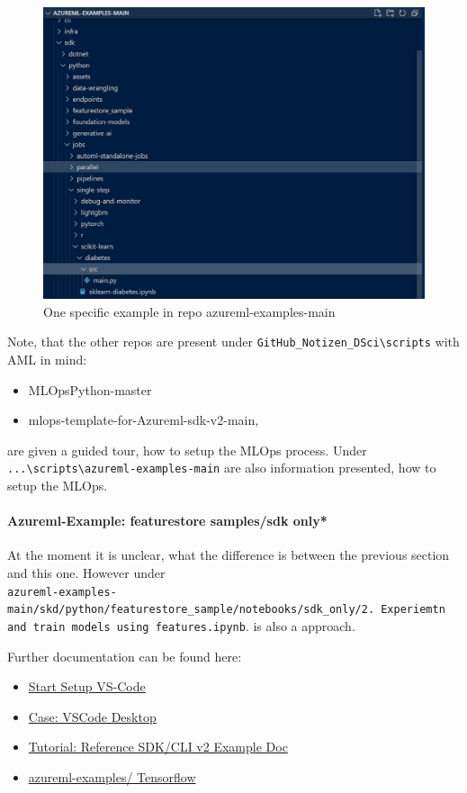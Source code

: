 \begin{figure}[H]
	\centering
	\includegraphics[scale = 0.4]{attachment/chapter_AML/Scc028}
	\caption{One specific example in repo azureml-examples-main}
\end{figure}
Note, that the other repos are present under \verb+GitHub_Notizen_DSci\scripts+ with \gls{AML} in mind:
\begin{itemize}
	\item MLOpsPython-master
	\item mlops-template-for-Azureml-sdk-v2-main,
\end{itemize}
are given a guided tour, how to setup the \gls{MLOps} process. Under \verb+...\scripts\azureml-examples-main+ are also information presented, how to setup the \gls{MLOps}.

\paragraph{Azureml-Example: featurestore samples/sdk only*}
At the moment it is unclear, what the difference is between the previous section and this one. However under\\
\verb+azureml-examples-main/skd/python/featurestore_sample/notebooks/sdk_only/2. Experiemtn and train models using features.ipynb+. is also a approach.


Further documentation can be found here:
\begin{itemize}
	\item \href{https://learn.microsoft.com/de-de/azure/machine-learning/how-to-setup-vs-code?view=azureml-api-2}{Start Setup VS-Code}
	\item \href{https://learn.microsoft.com/de-de/azure/machine-learning/how-to-launch-vs-code-remote?view=azureml-api-2&tabs=vscode-desktop}{Case: VSCode Desktop}
	\item \href{https://learn.microsoft.com/de-de/azure/machine-learning/tutorial-train-deploy-image-classification-model-vscode?view=azureml-api-2}{Tutorial: Reference SDK/CLI v2 Example Doc}
	\item \href{https://github.com/Azure/azureml-examples/blob/main/cli/jobs/single-step/tensorflow/mnist/src/train.py}{azureml-examples/ Tensorflow}
\end{itemize}




